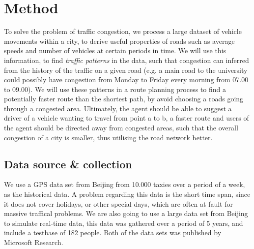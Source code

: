 \section{Method}
To solve the problem of traffic congestion, we process a large dataset of vehicle movements within a city, to derive useful properties of roads such as average speeds and number of vehicles at certain periods in time. We will use this information, to find \emph{traffic patterns} in the data, such that congestion can inferred from the history of the traffic on a given road (e.g. a main road to the university could possibly have congestion from Monday to Friday every morning from 07.00 to 09.00). We will use these patterns in a route planning process to find a potentially faster route than the shortest path, by avoid choosing a roads going through a congested area. Ultimately, the agent should be able to suggest a driver of a vehicle wanting to travel from point a to b, a faster route and users of the agent should be directed away from congested areas, such that the overall congestion of a city is smaller, thus utilising the road network better.

\subsection*{Data source \& collection}
We use a GPS data set from Beijing from 10.000 taxies over a period of a week, as the historical data\cite{Tdrive}. A problem regarding this data is the short time span, since it does not cover holidays, or other special days, which are often at fault for massive traffical problems. We are also going to use a large data set from Beijing to simulate real-time data, this data was gathered over a period of 5 years, and include a testbase of 182 people\cite{Geolife}. Both of the data sets was published by Microsoft Research.

